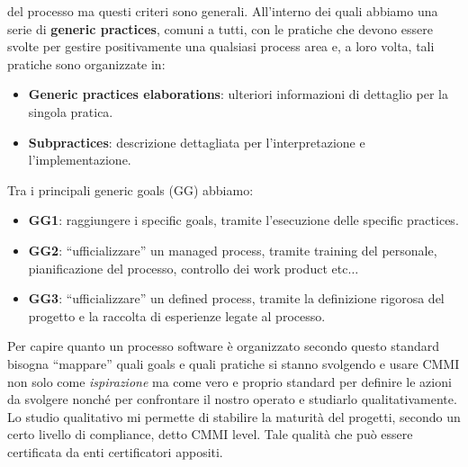 \begin{itemize}
\begin{enumerate}
                        del processo ma questi criteri sono generali. All'interno
                        dei quali abbiamo una serie di \textbf{generic practices},
                        comuni a tutti, con le pratiche che devono essere svolte
                        per gestire positivamente una qualsiasi process area e,
                        a loro volta, tali pratiche sono organizzate in:
                        \begin{itemize}
                              \item \textbf{Generic practices elaborations}:
                                    ulteriori informazioni di dettaglio
                                    per la singola pratica.
                              \item \textbf{Subpractices}: descrizione
                                    dettagliata per l'interpretazione e
                                    l'implementazione.
                        \end{itemize}
                        Tra i principali generic goals (GG) abbiamo:
                        \begin{itemize}
                              \item \textbf{GG1}: raggiungere i specific goals,
                                    tramite l'esecuzione delle specific practices.
                              \item \textbf{GG2}: “ufficializzare” un managed
                                    process, tramite training del personale,
                                    pianificazione del processo, controllo dei
                                    work product etc$\dots$
                              \item \textbf{GG3}: “ufficializzare” un defined
                                    process, tramite la definizione rigorosa del
                                    progetto e la raccolta di esperienze legate
                                    al processo.
                        \end{itemize}
            \end{enumerate}
\end{itemize}
Per capire quanto un processo software è organizzato secondo questo standard
bisogna “mappare” quali goals e quali pratiche si stanno svolgendo e usare CMMI
non solo come \textit{ispirazione} ma come vero e proprio standard per definire
le azioni da svolgere nonché per confrontare il nostro operato e studiarlo
qualitativamente. Lo studio qualitativo mi permette di stabilire la maturità del
progetti, secondo un certo livello di compliance, detto CMMI level. Tale qualità
che può essere certificata da enti certificatori appositi.

